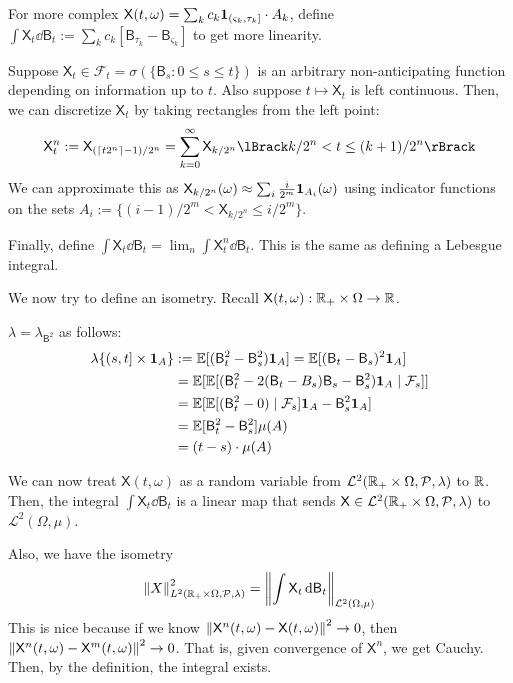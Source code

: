 \documentclass[notes]{agony}
\newcommand{\E}{\mathbb{E}}
\newcommand{\rv}{\mathsf}
\newcommand{\B}{\rv{B}}
\newcommand{\X}{\rv{X}}
\begin{document}
For more complex $\X(t,\omega) = \sum_k c_k\vb 1_{(\varsigma_k,\tau_k]}\cdot A_k$,
define $\int \X_t \dd{\B_t} := \sum_k c_k [\B_{\tau_k} - \B_{\varsigma_k}]$
to get more linearity.

Suppose $\X_t \in \mathcal F_t = \sigma(\{\B_s : 0 \leq s \leq t\})$
is an arbitrary non-anticipating function depending on information up to $t$.
Also suppose $t \mapsto \X_t$ is left continuous.
Then, we can discretize $\X_t$ by taking rectangles from the left point:
\begin{align*}
	\X_t^n := \X_{(\ceil{t2^n}-1)/2^n} = \sum_{k=0}^\infty \X_{k/2^n}\lBrack k/2^n < t \leq (k+1)/2^n\rBrack
\end{align*}
We can approximate this as $\X_{k/2^n}(\omega) \approx \sum_i \frac{i}{2^m} \vb 1_{A_i}(\omega)$
using indicator functions on the sets $A_i := \{(i-1)/2^m < \X_{k/2^n} \leq i/2^m\}$.

Finally, define $\int \X_t \dd{\B_t} = \lim_n \int \X_t^n \dd{\B_t}$.
This is the same as defining a Lebesgue integral.

We now try to define an isometry.
Recall $\X(t,\omega) : \R_+ \times \Omega \to \R$.

\begin{defn}
	$\lambda = \lambda_{\B^2}$ as follows:
	\begin{align*}
		\lambda\{(s,t]\times\vb 1_A\}
		 & := \E[(\B_t^2 - \B_s^2)\vb 1_A] = \E[(\B_t-\B_s)^2\vb 1_A]             \\
		 & = \E[\E[(\B_t^2 - 2(\B_t-B_s)\B_s - \B_s^2)\vb 1_A \mid \mathcal F_s]] \\
		 & = \E[\E[(\B_t^2 - 0 )\mid \mathcal F_s]\vb 1_A - \B_s^2\vb 1_A]        \\
		 & = \E[\B_t^2 - \B_s^2]\mu(A)                                            \\
		 & = (t-s)\cdot\mu(A)
	\end{align*}
\end{defn}
We can now treat $\X(t,\omega)$ as a random variable from $\mathcal L^2(\mathbb{R}_+\times\Omega,\mathcal P,\lambda)$ to $\mathbb{R}$.
Then, the integral $\int \X_t\dd{\B_t}$ is a linear map that sends $\X \in \mathcal L^2(\R_+\times\Omega,\mathcal P,\lambda)$ to $\mathcal L^2(\Omega,\mu)$.

Also, we have the isometry
\[
	\norm{X}^2_{L^2(\R_+\times\Omega,\mathcal P,\lambda)} = \norm{\int \X_t\dd{\B_t}}_{\mathcal L^2(\Omega,\mu)}
\]
This is nice because if we know $\norm{\X^n(t,\omega) - \X(t,\omega)}^2 \to 0$,
then $\norm{\X^n(t,\omega) - \X^m(t,\omega)}^2 \to 0$.
That is, given convergence of $\X^n$, we get Cauchy.
Then, by the definition, the integral exists.
\end{document}
